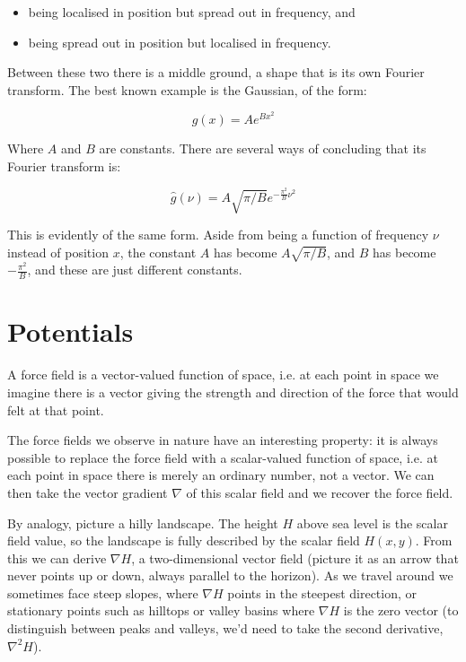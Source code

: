 \begin{itemize}
    \item being localised in position but spread out in frequency, and
    \item being spread out in position but localised in frequency.
\end{itemize}

Between these two there is a middle ground, a shape that is its own Fourier transform. The best known example is the Gaussian, of the form:

$$g(x) = Ae^{Bx^2}$$

Where $A$ and $B$ are constants. There are several ways of concluding that its Fourier transform is:

$$\hat{g}(\nu) = A \sqrt{\pi/B} e^{-\frac{\pi^2}{B} \nu^2}$$

This is evidently of the same form. Aside from being a function of frequency $\nu$ instead of position $x$, the constant $A$ has become $A \sqrt{\pi/B}$, and $B$ has become $-\frac{\pi^2}{B}$, and these are just different constants.

\section{Potentials} \label{sec:potential}

A force field is a vector-valued function of space, i.e. at each point in space we imagine there is a vector giving the strength and direction of the force that would felt at that point.

The force fields we observe in nature have an interesting property: it is always possible to replace the force field with a scalar-valued function of space, i.e. at each point in space there is merely an ordinary number, not a vector. We can then take the vector gradient $\nabla$ of this scalar field and we recover the force field.

By analogy, picture a hilly landscape. The height $H$ above sea level is the scalar field value, so the landscape is fully described by the scalar field $H(x, y)$. From this we can derive $\nabla H$, a two-dimensional vector field (picture it as an arrow that never points up or down, always parallel to the horizon). As we travel around we sometimes face steep slopes, where $\nabla H$ points in the steepest direction, or stationary points such as hilltops or valley basins where $\nabla H$ is the zero vector (to distinguish between peaks and valleys, we'd need to take the second derivative, $\nabla^2H$).

